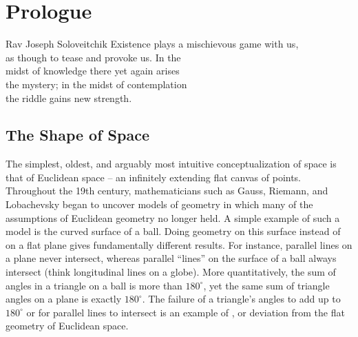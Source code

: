 \chapter*{Prologue}

\begin{epigraph}{19.5em}{Rav Joseph Soloveitchik}
	Existence plays a mischievous game with us,\\
	as though to tease and provoke us. In the \\
	midst of knowledge there yet again arises \\
	the mystery; in the midst of contemplation\\
	the riddle gains new strength.
\end{epigraph}
%
\section*{The Shape of Space}

The simplest, oldest, and arguably most intuitive conceptualization of space is that of Euclidean space -- an infinitely extending flat canvas of points.
Throughout the 19th century, mathematicians such as Gauss, Riemann, and Lobachevsky began to uncover models of geometry in which many of the assumptions of Euclidean geometry no longer held.
A simple example of such a model is the curved surface of a ball. Doing geometry on this surface instead of on a flat plane gives fundamentally different results. For instance, parallel lines on a plane never intersect, whereas parallel ``lines'' on the surface of a ball always intersect (think longitudinal lines on a globe).
More quantitatively, the sum of angles in a triangle on a ball is more than $180^\circ$, yet the same sum of triangle angles on a plane is exactly $180^\circ$. The failure of a triangle's angles to add up to $180^\circ$ or for parallel lines to intersect is an example of , or deviation from the flat geometry of Euclidean space.

